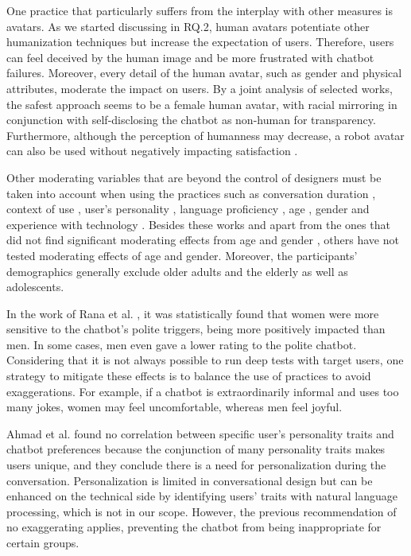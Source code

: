 One practice that particularly suffers from the interplay with other measures is avatars. As we started discussing in RQ.2, human avatars potentiate other humanization techniques but increase the expectation of users. Therefore, users can feel deceived by the human image and be more frustrated with chatbot failures. Moreover, every detail of the human avatar, such as gender and physical attributes, moderate the impact on users. By a joint analysis of selected works, the safest approach seems to be a female human avatar, with racial mirroring in conjunction with self-disclosing the chatbot as non-human for transparency. Furthermore, although the perception of humanness may decrease, a robot avatar can also be used without negatively impacting satisfaction . 

Other moderating variables that are beyond the control of designers must be taken into account when using the practices such as conversation duration , context of use , user's personality , language proficiency , age , gender  and experience with technology . Besides these works and apart from the ones that did not find significant moderating effects from age and gender , others have not tested moderating effects of age and gender. Moreover, the participants' demographics generally exclude older adults and the elderly as well as adolescents. 

In the work of Rana et al. , it was statistically found that women were more sensitive to the chatbot's polite triggers, being more positively impacted than men. In some cases, men even gave a lower rating to the polite chatbot. Considering that it is not always possible to run deep tests with target users, one strategy to mitigate these effects is to balance the use of practices to avoid exaggerations. For example, if a chatbot is extraordinarily informal and uses too many jokes, women may feel uncomfortable, whereas men feel joyful.

Ahmad et al.  found no correlation between specific user's personality traits and chatbot preferences because the conjunction of many personality traits makes users unique, and they conclude there is a need for personalization during the conversation. Personalization is limited in conversational design but can be enhanced on the technical side by identifying users' traits with natural language processing, which is not in our scope. However, the previous recommendation of no exaggerating applies, preventing the chatbot from being inappropriate for certain groups.

